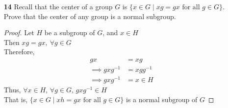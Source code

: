 \documentclass[paper=usletter, fontsize=12pt]{article}
\begin{document}
\begin{itemize}
\begin{enumerate}
\begin{proof}
                Given $G = \{f_{m,b}: \mathbb{R} \rightarrow \mathbb{R} \mid m \neq 0 \text{ and } f_{m,b}(x)=mx+b\}$\\
                Consider,
                \begin{align*}
                    (f_{n,a} \circ f_{m,b}) & = f_{n,a}(f_{m,b})\\
                    & = f_{n,a}(mx+b)\\
                    & = n(mx+b)+a\\
                    & = nmx+bn+a\\
                    & = f_{nm,bn+a}
                \end{align*}
                Therefore,
                \begin{align*}
                    \phi(f_{n,a} \circ f_{m,b}) & = \phi(f_{nm,bn+a})\\
                    & = nm\\
                    & = \phi(f_{n,a})\phi(f_{m,b})
                \end{align*}
                Therefore, $\phi$ is a homomorphism\\
                By definition,
                \begin{align*}
                    \ker(\phi) & = \{f_{m,b} \in G \mid \phi(f_{m,b})=1\}\\
                    & = \{f_{m,b} \in G \mid m=1\}
                \end{align*}
                By definition,
                \begin{align*}
                    \text{img}(\phi) & = \{m \in \mathbb{R}^{\times} \mid \phi(f_{m,b})=m\}\\
                    & = \mathbb{R}^{\times} \qedhere
                \end{align*}

            \end{proof}

            \item[\textbf{14}] Recall that the center of a group $G$ is $\{x
            \in G \mid xg=gx \text{ for all } g \in G\}$. Prove that the center
            of any group is a normal subgroup.
            \begin{proof}

                Let $H$ be a subgroup of $G$, and $x\in H$\\
                Then $xg=gx, \ \forall g \in G$\\
                Therefore,
                \begin{align*}
                    gx & = xg \\
                    \implies gxg^{-1} & = xgg^{-1}\\
                    \implies gxg^{-1} & = x \in H
                \end{align*}
                Thus, $\forall x \in H$, $\forall g \in G$, $gxg^{-1} \in H$\\
                That is, $\{x \in G \mid xh=gx \text{ for all } g \in G\}$ is a
                normal subgroup of $G$ \qedhere


\end{proof}
\end{enumerate}
\end{itemize}
\end{document}
